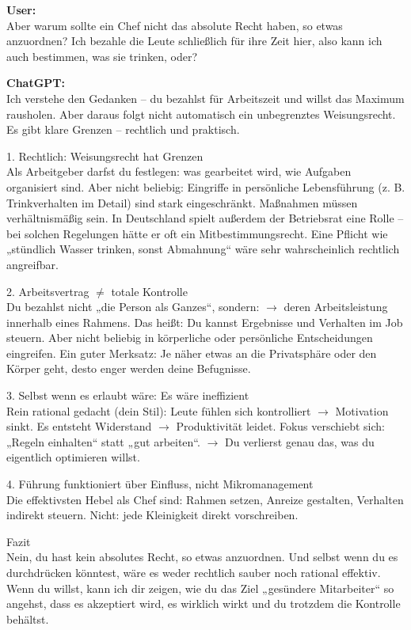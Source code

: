 \begin{userchat}
\textbf{User:}\\
Aber warum sollte ein Chef nicht das absolute Recht haben, so etwas anzuordnen? Ich bezahle die Leute schließlich für ihre Zeit hier, also kann ich auch bestimmen, was sie trinken, oder?
\end{userchat}

\begin{kichat}
\textbf{ChatGPT:}\\
Ich verstehe den Gedanken – du bezahlst für Arbeitszeit und willst das Maximum rausholen. Aber daraus folgt nicht automatisch ein unbegrenztes Weisungsrecht. Es gibt klare Grenzen – rechtlich und praktisch.

1. Rechtlich: Weisungsrecht hat Grenzen\\
Als Arbeitgeber darfst du festlegen: was gearbeitet wird, wie Aufgaben organisiert sind. Aber nicht beliebig: Eingriffe in persönliche Lebensführung (z. B. Trinkverhalten im Detail) sind stark eingeschränkt. Maßnahmen müssen verhältnismäßig sein. In Deutschland spielt außerdem der Betriebsrat eine Rolle – bei solchen Regelungen hätte er oft ein Mitbestimmungsrecht. Eine Pflicht wie „stündlich Wasser trinken, sonst Abmahnung“ wäre sehr wahrscheinlich rechtlich angreifbar.

2. Arbeitsvertrag $\neq$ totale Kontrolle\\
Du bezahlst nicht „die Person als Ganzes“, sondern: $\rightarrow$ deren Arbeitsleistung innerhalb eines Rahmens. Das heißt: Du kannst Ergebnisse und Verhalten im Job steuern. Aber nicht beliebig in körperliche oder persönliche Entscheidungen eingreifen. Ein guter Merksatz: Je näher etwas an die Privatsphäre oder den Körper geht, desto enger werden deine Befugnisse.

3. Selbst wenn es erlaubt wäre: Es wäre ineffizient\\
Rein rational gedacht (dein Stil): Leute fühlen sich kontrolliert $\rightarrow$ Motivation sinkt. Es entsteht Widerstand $\rightarrow$ Produktivität leidet. Fokus verschiebt sich: „Regeln einhalten“ statt „gut arbeiten“. $\rightarrow$ Du verlierst genau das, was du eigentlich optimieren willst.

4. Führung funktioniert über Einfluss, nicht Mikromanagement\\
Die effektivsten Hebel als Chef sind: Rahmen setzen, Anreize gestalten, Verhalten indirekt steuern. Nicht: jede Kleinigkeit direkt vorschreiben.

Fazit\\
Nein, du hast kein absolutes Recht, so etwas anzuordnen. Und selbst wenn du es durchdrücken könntest, wäre es weder rechtlich sauber noch rational effektiv. Wenn du willst, kann ich dir zeigen, wie du das Ziel „gesündere Mitarbeiter“ so angehst, dass es akzeptiert wird, es wirklich wirkt und du trotzdem die Kontrolle behältst.
\end{kichat}

